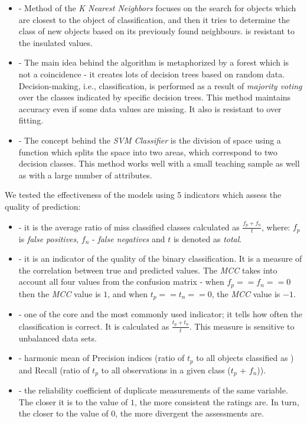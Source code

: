 \begin{itemize}
  \item {} - Method of the \emph{K Nearest Neighbors} focuses on the search for objects which are closest to the object of classification, and then it tries to determine the class of new objects based on its previously found neighbours.  is resistant to the insulated values.
  \item {} - The main idea behind the algorithm is metaphorized by a forest which is not a coincidence - it creates lots of decision trees based on random data. Decision-making, i.e., classification, is performed as a result of \emph{majority voting} over the classes indicated by specific decision trees. This method maintains accuracy even if some data values are missing. It also is resistant to over fitting.
  \item {} - The concept behind the \emph{SVM Classifier} is the division of space using a function which splits the space into two areas, which correspond to two decision classes. This method works well with a small teaching sample as well as with a large number of attributes.
\end{itemize}

We tested the effectiveness of the models using 5 indicators which assess the quality of prediction:

\begin{itemize}
  \item {} - it is the average ratio of miss classified classes calculated as $\frac{f_{p} + f_{n}}{t}$, where: $f_{p}$ is \emph{false positives}, $f_{n}$ - \emph{false negatives} and $t$ is denoted as \emph{total}.
  \item {} - it is an indicator of the quality of the binary classification. It is a measure of the correlation between true and predicted values. The \emph{MCC} takes into account all four values from the confusion matrix - when $f_{p} == f_{n} == 0$ then the \emph{MCC} value is $1$, and when $t_{p} == t_{n} == 0$, the \emph{MCC} value is $-1$. 
  \item {} - one of the core and the most commonly used indicator; it tells how often the classification is correct. It is calculated as $\frac{t_{p} + t_{n}}{t}$. This measure is sensitive to unbalanced data sets.
  \item {} - harmonic mean of Precision indices (ratio of $t_{p}$ to all objects classified as ) and Recall (ratio of $t_{p}$ to all observations in a given class ($t_{p}$ + $f_{n}$)).
  \item {} - the reliability coefficient of duplicate measurements of the same variable. The closer it is to the value of $1$, the more consistent the ratings are. In turn, the closer to the value of $0$, the more divergent the assessments are.
\end{itemize}
